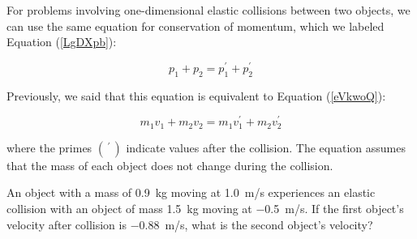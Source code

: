 \documentclass{article}
\numberwithin{equation}{section}
\numberwithin{figure}{section}
\begin{document}
For problems involving one-dimensional elastic collisions between two objects, we can use the same equation for conservation of momentum, which we labeled Equation (\ref{LgDXpb}):

\begin{equation*}
    p_1 + p_2 = p_1^{\prime} + p_2^{\prime}
\end{equation*}

Previously, we said that this equation is equivalent to Equation (\ref{eVkwoQ}):

\begin{equation*} 
    m_1 v_1 + m_2 v_2 = m_1 v_1^{\prime} + m_2 v_2^{\prime}
\end{equation*}

where the primes $\left(\,^{\prime}\,\right)$ indicate values after the collision. The equation assumes that the mass of each object does not change during the collision.

\begin{example} \label{wXY1rT}
    An object with a mass of \SI{0.9}{kg} moving at \SI{1.0}{m/s} experiences an elastic collision with an object of mass \SI{1.5}{kg} moving at \SI{-0.5}{m/s}. If the first object's velocity after collision is \SI{-0.88}{m/s}, what is the second object's velocity?
\end{example}
\end{document}
